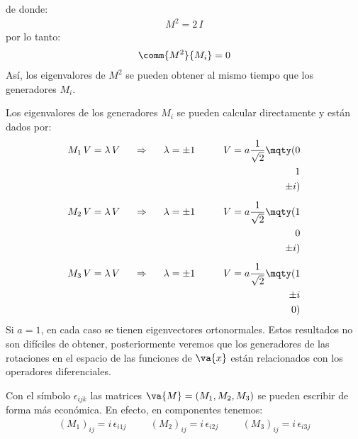 de donde:
\begin{align}
M^{2} = 2 \, I
\label{eq:ecuacion_10_085}
\end{align}
por lo tanto:
\begin{align}
\comm{M^{2}}{M_{i}} = 0
\label{eq:ecuacion_10_086}
\end{align}
Así, los eigenvalores de $M^{2}$ se pueden obtener al mismo tiempo que los generadores $M_{i}$.
\par
Los eigenvalores de los generadores $M_{i}$ se pueden calcular directamente y están dados por:
\begin{align}
M_{1} \, V = \lambda \, V \hspace{0.5cm} \Rightarrow \hspace{0.5cm} \lambda = \pm 1 \hspace{1cm} V = a \dfrac{1}{\sqrt{2}} \mqty(0 \\ 1 \\ \pm i) \label{eq:ecuacion_10_087} \\[0.5em]
M_{2} \, V = \lambda \, V \hspace{0.5cm} \Rightarrow \hspace{0.5cm} \lambda = \pm 1 \hspace{1cm} V = a \dfrac{1}{\sqrt{2}} \mqty(1 \\ 0 \\ \pm i) \label{eq:ecuacion_10_088} \\[0.5em]
M_{3} \, V = \lambda \, V \hspace{0.5cm} \Rightarrow \hspace{0.5cm} \lambda = \pm 1 \hspace{1cm} V = a \dfrac{1}{\sqrt{2}} \mqty(1 \\ \pm i \\ 0) \label{eq:ecuacion_10_089}
\end{align}
Si $a = 1$, en cada caso se tienen eigenvectores ortonormales. Estos resultados no son difíciles de obtener, posteriormente veremos que los generadores de las rotaciones en el espacio de las funciones de $\va{x}$ están relacionados con los operadores diferenciales.
\par
Con el símbolo $\epsilon_{ijk}$ las matrices $\va{M} = (M_{1}, M_{2}, M_{3})$ se pueden escribir de forma más económica. En efecto, en componentes tenemos:
\begin{align}
(M_{1})_{ij} = i \, \epsilon_{i 1 j} \hspace{1cm} (M_{2})_{ij} = i \, \epsilon_{i 2 j} \hspace{1cm} (M_{3})_{ij} = i \, \epsilon_{i 3 j} \label{eq:ecuacion_10_090}
\end{align}
